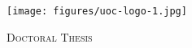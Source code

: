 \documentclass[
11pt, %
english, %
singlespacing, %
liststotoc, %
toctotoc, %
headsepline, %
]{MastersDoctoralThesis} %
\author{Savvas \textsc{Paragkamian}} %
\begin{document}
\frontmatter %

\pagestyle{plain} %
\hypersetup{linkcolor=teal}

\begin{titlepage}
\begin{center}
\begin{minipage}{4cm}
\begin{flushleft}
    \raggedleft
\texttt{[image: figures/uoc-logo-1.jpg]} %
\end{flushleft}
\end{minipage}
\begin{minipage}{6cm}
\begin{flushright}
\LARGE \univname
\end{flushright}
\end{minipage}

\vspace{1cm}
\textsc{\Large Doctoral Thesis}\\[0.5cm] %

\HRule \\[0.4cm] %
{\huge \bfseries \ttitle\par}\vspace{0.4cm} %
\HRule \\[1.0cm] %
 

\end{center}
\end{titlepage}
\end{document}

